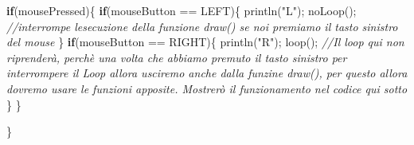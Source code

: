\documentclass[
]{article}
\newenvironment{Shaded}{}{}
\newcommand{\CommentTok}[1]{\textcolor[rgb]{0.38,0.63,0.69}{\textit{#1}}}
\newcommand{\ControlFlowTok}[1]{\textcolor[rgb]{0.00,0.44,0.13}{\textbf{#1}}}
\newcommand{\FunctionTok}[1]{\textcolor[rgb]{0.02,0.16,0.49}{#1}}
\newcommand{\NormalTok}[1]{#1}
\newcommand{\OperatorTok}[1]{\textcolor[rgb]{0.40,0.40,0.40}{#1}}
\newcommand{\StringTok}[1]{\textcolor[rgb]{0.25,0.44,0.63}{#1}}
\begin{document}
\begin{Shaded}
\begin{Highlighting}[]
  \ControlFlowTok{if}\OperatorTok{(}\NormalTok{mousePressed}\OperatorTok{)\{}
    \ControlFlowTok{if}\OperatorTok{(}\NormalTok{mouseButton }\OperatorTok{==}\NormalTok{ LEFT}\OperatorTok{)\{}
        \FunctionTok{println}\OperatorTok{(}\StringTok{"L"}\OperatorTok{);}
        \FunctionTok{noLoop}\OperatorTok{();} \CommentTok{//interrompe l\textquotesingle{}esecuzione della funzione \textquotesingle{}draw()\textquotesingle{} se noi premiamo il tasto sinistro del mouse}
    \OperatorTok{\}}
    \ControlFlowTok{if}\OperatorTok{(}\NormalTok{mouseButton }\OperatorTok{==}\NormalTok{ RIGHT}\OperatorTok{)\{}
        \FunctionTok{println}\OperatorTok{(}\StringTok{"R"}\OperatorTok{);}
        \FunctionTok{loop}\OperatorTok{();} \CommentTok{//Il loop qui non riprenderà, perchè una volta che abbiamo premuto il tasto sinistro per interrompere il Loop allora usciremo anche dalla funzine \textquotesingle{}draw()\textquotesingle{}, per questo allora dovremo usare le funzioni apposite. Mostrerò il funzionamento nel codice qui sotto }
    \OperatorTok{\}}
  \OperatorTok{\}}

\OperatorTok{\}}
\end{Highlighting}
\end{Shaded}
\end{document}
